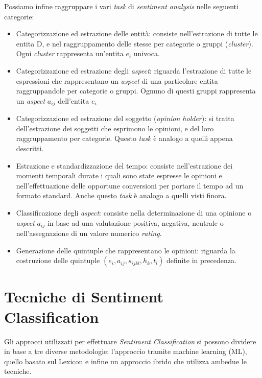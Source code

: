 \documentclass[a4paper,12pt,openright,twoside]{report}
\theoremstyle{definition}
\begin{document}
Possiamo infine raggruppare i vari \emph{task} di \emph{sentiment analysis} nelle seguenti categorie:
\begin{itemize}
	\item Categorizzazione ed estrazione delle entità: consiste nell'estrazione di tutte le entita D,
		e nel raggruppamento delle stesse per categorie o gruppi (\emph{cluster}). Ogni \emph{cluster}
		rappresenta un'entita $e_i$ univoca.
	\item Categorizzazione ed estrazione degli \emph{aspect}: riguarda l'estrazione di tutte le espressioni
		che rappresentano un \emph{aspect} di una particolare entita raggruppandole
		per categorie o gruppi. Ognuno di questi gruppi rappresenta un \emph{aspect} $a_{ij}$
		dell'entita $e_i$
	\item Categorizzazione ed estrazione del soggetto (\emph{opinion holder}): si tratta dell'estrazione
		dei soggetti che esprimono le opinioni, e del loro raggruppamento per categorie. Questo \emph{task}
		è analogo a quelli appena descritti.
	\item Estrazione e standardizzazione del tempo: consiste nell'estrazione dei momenti temporali 
		durate i quali 
		sono state espresse le opinioni e nell'effettuazione delle opportune conversioni per portare
		il tempo ad un formato standard. Anche questo \emph{task} è analogo a quelli visti finora.
	\item Classificazione degli \emph{aspect}: consiste nella determinazione di una opinione o \emph{aspect} $a_{ij}$
		in base ad una valutazione positiva, negativa, neutrale o nell'assegnazione di un valore numerico \emph{rating}.
	\item Generazione delle quintuple che rappresentano le opinioni: riguarda la costruzione delle quintuple 
		$(e_i, a_{ij}, s_{ijkl}, h_k, t_l)$ definite in precedenza.
\end{itemize}

\section{Tecniche di Sentiment Classification}
Gli approcci utilizzati per effettuare \emph{Sentiment Classification}
si possono dividere in base a tre diverse metodologie: l'approccio tramite
machine learning (ML), quello basato sul Lexicon e infine un approccio ibrido
che utilizza ambedue le tecniche.
\end{document}
